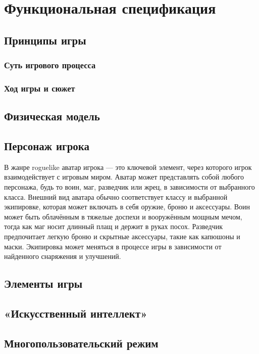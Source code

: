 \documentclass{article}
\begin{document}
\section{Функциональная спецификация}
\subsection{Принципы игры}
\subsubsection{Суть игрового процесса}

\subsubsection{Ход игры и сюжет}

\subsection{Физическая модель}
\subsection{Персонаж игрока}
В жанре roguelike аватар игрока — это ключевой элемент, через которого игрок взаимодействует с игровым миром. Аватар может представлять собой любого персонажа, будь то воин, маг, разведчик или жрец, в зависимости от выбранного класса. Внешний вид аватара обычно соответствует классу и выбранной экипировке, которая может включать в себя оружие, броню и аксессуары. Воин может быть облачённым в тяжелые доспехи и вооружённым мощным мечом, тогда как маг носит длинный плащ и держит в руках посох. Разведчик предпочитает легкую броню и скрытные аксессуары, такие как капюшоны и маски. Экипировка может меняться в процессе игры в зависимости от найденного снаряжения и улучшений.
\subsection{Элементы игры}

\subsection{«Искусственный интеллект»}

\subsection{Многопользовательский режим}
\end{document}
